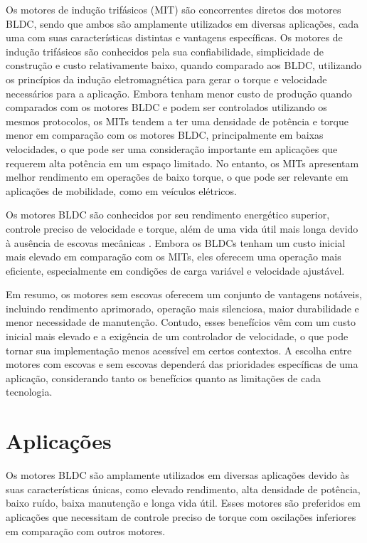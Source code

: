 \documentclass[12pt, a4paper, openright, oneside, brazilian]{abntex2}
\begin{document}
 Os motores de indução trifásicos (MIT) são concorrentes diretos dos motores BLDC, sendo que ambos são amplamente utilizados em diversas aplicações, cada uma com suas características distintas e vantagens específicas. Os motores de indução trifásicos são conhecidos pela sua confiabilidade, simplicidade de construção e custo relativamente baixo, quando comparado aos BLDC, utilizando os princípios da indução eletromagnética para gerar o torque e velocidade necessários para a aplicação. Embora tenham menor custo de produção quando comparados com os motores BLDC e podem ser controlados utilizando os mesmos protocolos, os MITs tendem a ter uma densidade de potência e torque menor em comparação com os motores BLDC, principalmente em baixas velocidades, o que pode ser uma consideração importante em aplicações que requerem alta potência em um espaço limitado. No entanto, os MITs apresentam melhor rendimento em operações de baixo torque, o que pode ser relevante em aplicações de mobilidade, como em veículos elétricos. 

 Os motores BLDC são conhecidos por seu rendimento energético superior, controle preciso de velocidade e torque, além de uma vida útil mais longa devido à ausência de escovas mecânicas \cite{gieras2009permanent}. Embora os BLDCs tenham um custo inicial mais elevado em comparação com os MITs, eles oferecem uma operação mais eficiente, especialmente em condições de carga variável e velocidade ajustável. 

 Em resumo, os motores sem escovas oferecem um conjunto de vantagens notáveis, incluindo rendimento aprimorado, operação mais silenciosa, maior durabilidade e menor necessidade de manutenção. Contudo, esses benefícios vêm com um custo inicial mais elevado e a exigência de um controlador de velocidade, o que pode tornar sua implementação menos acessível em certos contextos. A escolha entre motores com escovas e sem escovas dependerá das prioridades específicas de uma aplicação, considerando tanto os benefícios quanto as limitações de cada tecnologia. 

 \pagebreak 

 \section{Aplicações} 
 Os motores BLDC são amplamente utilizados em diversas aplicações devido às suas características únicas, como elevado rendimento, alta densidade de potência, baixo ruído, baixa manutenção e longa vida útil. Esses motores são preferidos em aplicações que necessitam de controle preciso de torque com oscilações inferiores em comparação com outros motores. 
\end{document}
